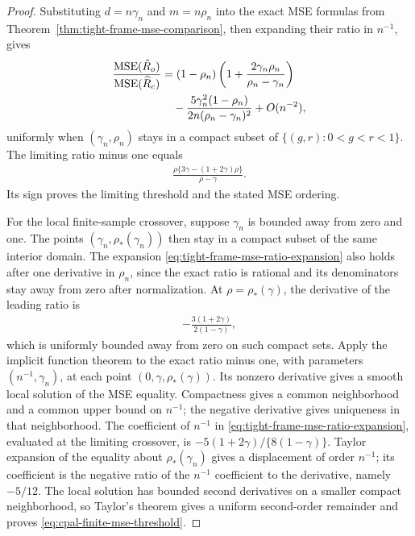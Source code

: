 \documentclass{article}
\theoremstyle{plain}
\theoremstyle{definition}
\theoremstyle{definition}
\newcommand{\hR}{\hat{R}}
\begin{document}
\begin{proof}

Substituting $d=n\gamma_n$ and $m=n\rho_n$ into the exact MSE formulas
from Theorem~\ref{thm:tight-frame-mse-comparison}, then expanding their
ratio in $n^{-1}$, gives
\begin{align}
    \frac{\operatorname{MSE}(\hR_o)}
         {\operatorname{MSE}(\widehat R_c)}
    &=(1-\rho_n)\left(1+
       \frac{2\gamma_n\rho_n}{\rho_n-\gamma_n}\right) \notag\\
    &\quad-\frac{5\gamma_n^2(1-\rho_n)}
       {2n(\rho_n-\gamma_n)^2}+O(n^{-2}),
    \label{eq:tight-frame-mse-ratio-expansion}
\end{align}
uniformly when $(\gamma_n,\rho_n)$ stays in a compact subset of
$\{(g,r):0<g<r<1\}$. The limiting ratio minus one equals
\begin{align*}
    \frac{\rho\{3\gamma-(1+2\gamma)\rho\}}{\rho-\gamma}.
\end{align*}
     Its sign proves the limiting threshold and the stated MSE ordering. 

For the local finite-sample crossover, suppose $\gamma_n$ is bounded away
from zero and one. The points
$(\gamma_n,\rho_*(\gamma_n))$ then stay in a compact subset of the same
interior domain. The expansion
\eqref{eq:tight-frame-mse-ratio-expansion} also holds after one derivative
in $\rho_n$, since the exact ratio is rational and its denominators stay
away from zero after normalization. At $\rho=\rho_*(\gamma)$, the
derivative of the leading ratio is
\begin{align*}
    -\frac{3(1+2\gamma)}{2(1-\gamma)},
\end{align*}
which is uniformly bounded away from zero on such compact sets.
Apply the implicit function theorem to the exact ratio minus one, with
parameters $(n^{-1},\gamma_n)$, at each point
$(0,\gamma,\rho_*(\gamma))$. Its nonzero derivative gives a smooth local
solution of the MSE equality. Compactness gives a common neighborhood
and a common upper bound on $n^{-1}$; the negative derivative gives
uniqueness in that neighborhood.
The coefficient of $n^{-1}$ in
\eqref{eq:tight-frame-mse-ratio-expansion}, evaluated at the limiting
crossover, is $-5(1+2\gamma)/\{8(1-\gamma)\}$. Taylor expansion of the
equality about $\rho_*(\gamma_n)$ gives a displacement of order $n^{-1}$;
its coefficient is the negative ratio of the $n^{-1}$ coefficient to the
derivative, namely $-5/12$. The local solution has bounded second
derivatives on a smaller compact neighborhood, so Taylor's theorem gives
a uniform second-order remainder and proves
\eqref{eq:cpal-finite-mse-threshold}.
\end{proof}
\end{document}
